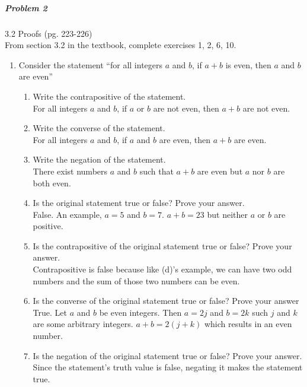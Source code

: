 \documentclass[11pt,a4paper]{article}
\begin{document}
\begin{enumerate}
    \end{enumerate}
	
	\subparagraph{Problem 2} 3.2 Proofs (pg. 223-226) \\
	
		From section 3.2 in the textbook, complete exercises 1, 2, 6, 10.

        \begin{enumerate}

        \item Consider the statement “for all integers $a$ and $b$, if $a + b$ is even, then $a$ and $b$ are even”
            \begin{enumerate}
                \item Write the contrapositive of the statement.\\
                For all integers $a$ and $b$, if $a$ or $b$ are not even, then $a + b$ are not even.
                \item Write the converse of the statement.\\
                    For all integers $a$ and $b$, if $a$ and $b$ are even, then $a + b$ are even.
                \item Write the negation of the statement.\\
                    There exist numbers $a$ and $b$ such that $a + b$ are even but $a$ nor $b$ are both even.

                \item Is the original statement true or false? Prove your answer.\\
                    False. An example, $a = 5$ and $b = 7$. $a + b = 23$ but neither $a$ or $b$ are positive.
                \item Is the contrapositive of the original statement true or false? Prove your answer.\\
                    Contrapositive is false because like (d)'s example, we can have two odd numbers and the sum of those two numbers can be even.  
                \item Is the converse of the original statement true or false? Prove your answer\\
                    True. Let $a$ and $b$ be even integers. Then $a = 2j$ and $b = 2k$ such $j$ and $k$ are some arbitrary integers. $a + b = 2(j + k)$ which results in an even number.   
                \item Is the negation of the original statement true or false? Prove your answer.\\
                    Since the statement's truth value is false, negating it makes the statement true.


\end{enumerate}
\end{enumerate}
\end{document}
